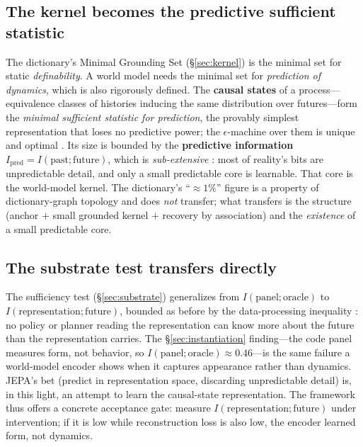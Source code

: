 \documentclass[10pt,twocolumn]{article}
\begin{document}
\subsection{The kernel becomes the predictive sufficient statistic}
The dictionary's Minimal Grounding Set (\S\ref{sec:kernel}) is the minimal set for
static \emph{definability}. A world model needs the minimal set for \emph{prediction
of dynamics}, which is also rigorously defined. The \textbf{causal states} of a
process---equivalence classes of histories inducing the same distribution over
futures---form the \emph{minimal sufficient statistic for prediction}, the
provably simplest representation that loses no predictive power; the
$\epsilon$-machine over them is unique and optimal \citep{shalizi2001computational}.
Its size is bounded by the \textbf{predictive information}
$I_{\mathrm{pred}}=I(\text{past};\text{future})$, which is \emph{sub-extensive}
\citep{bialek2001predictability}: most of reality's bits are unpredictable detail,
and only a small predictable core is learnable. That core is the world-model
kernel. The dictionary's ``$\approx1\%$'' figure is a property of dictionary-graph
topology and does \emph{not} transfer; what transfers is the structure
(anchor $+$ small grounded kernel $+$ recovery by association) and the
\emph{existence} of a small predictable core.

\subsection{The substrate test transfers directly}
The sufficiency test (\S\ref{sec:substrate}) generalizes from
$I(\text{panel};\text{oracle})$ to $I(\text{representation};\text{future})$,
bounded as before by the data-processing inequality \citep{cover2006elements}: no
policy or planner reading the representation can know more about the future than
the representation carries. The \S\ref{sec:instantiation} finding---the code panel
measures form, not behavior, so $I(\text{panel};\text{oracle})\approx0.46$---is the
same failure a world-model encoder shows when it captures appearance rather than
dynamics. JEPA's bet \citep{lecun2022path} (predict in representation space,
discarding unpredictable detail) is, in this light, an attempt to learn the
causal-state representation. The framework thus offers a concrete acceptance gate:
measure $I(\text{representation};\text{future})$ under intervention; if it is low
while reconstruction loss is also low, the encoder learned form, not dynamics.
\end{document}

